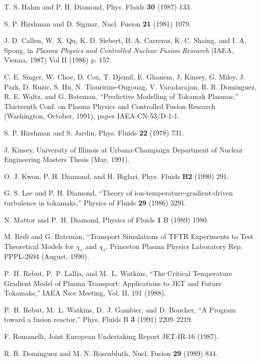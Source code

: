 \begin{thebibliography}{99}
 T. S. Hahm and P. H. Diamond, Phys. Fluids {\bf 30} (1987) 133.

 S. P. Hirshman and D. Sigmar, Nucl. Fusion {\bf 21}
(1981) 1079.

 J. D. Callen, W. X. Qu, K. D. Siebert,
B. A. Carreras, K. C. Shaing, and I. A. Spong,
in {\it Plasma Physics and Controlled Nuclear Fusion Research}
(IAEA, Vienna, 1987) Vol II (1986) p. 157.

 C. E. Singer, W. Choe, D. Cox, T. Djemil,
E. Ghanem, J, Kinsey, G. Miley, J. Park, D. Ruzic,
S. Hu, N. Tiouririne-Ougouag, V. Varadarajan,
R. R. Dominguez, R. E. Waltz, and G. Bateman,
``Predictive Modelling of Tokamak Plasmas,''
Thirteenth Conf. on Plasma Physics and Controlled Fusion
Research (Washington, October, 1991), paper IAEA-CN-53/D-1-1.

 S. P. Hirshman and S. Jardin, Phys. Fluids {\bf 22} (1978) 731.

 J. Kinsey, University of Illinois at
Urbana-Champaign Department of Nuclear Engineering
Masters Thesis (May, 1991).

 O. J. Kwon, P. H. Diamond, and H. Biglari,
Phys. Fluids {\bf B2} (1990) 291.

 G. S. Lee and P. H. Diamond,
``Theory of ion-temperature-gradient-driven turbulence in tokamaks,''
Physics of Fluids {\bf 29} (1986) 3291.

 N. Mattor and P.~H. Diamond, 
Physics of Fluids {\bf 1} B (1989) 1980.

 M. Redi and G. Bateman, ``Transport
Simulations of TFTR Experiments to Test Theoretical
Models for $\chi_{e}$ and $\chi_{i}$, Princeton
Plasma Physics Laboratory Rep. PPPL-2694 (August, 1990).

P.~H. Rebut, P.~P. Lallia, and M.~L. Watkins,
``The Critical Temperature Gradient Model of Plasma Transport:
Applications to JET and Future Tokamaks,''
IAEA Nice Meeting, Vol. II, 191 (1988).

P.~H. Rebut, M.~L. Watkins, D.~J. Gambier, and D. Boucher,
``A Program toward a fusion reactor,''
Phys. Fluids B {\bf 3} (1991) 2209--2219.

 F. Romanelli, Joint European Undertaking
Report JET-IR-16 (1987).

 R. R. Dominguez and M. N. Rosenbluth,
Nucl. Fusion {\bf 29} (1989) 844.


\end{thebibliography}

